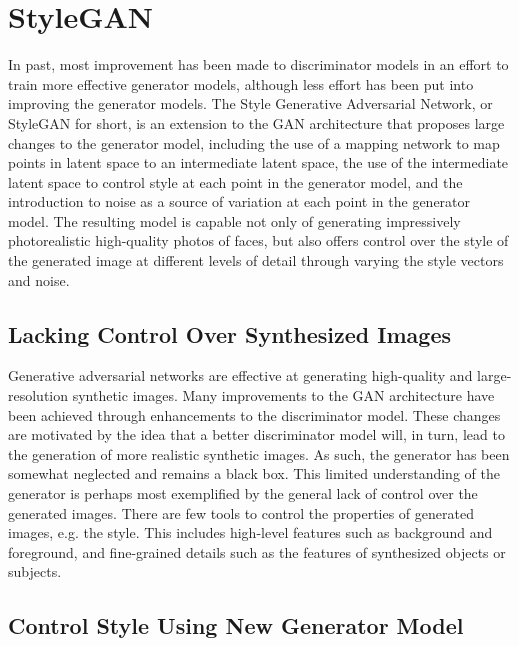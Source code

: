 \chapter{StyleGAN}
\begin{onehalfspace}
    In past, most improvement has been made to discriminator models in an effort to train more effective generator models, although less effort has been put into improving the generator models. The Style Generative Adversarial Network, or StyleGAN for short, is an extension to the GAN architecture that proposes large changes to the generator model, including the use of a mapping network to map points in latent space to an intermediate latent space, the use of the intermediate latent space to control style at each point in the generator model, and the introduction to noise as a source of variation at each point in the generator model. The resulting model is capable not only of generating impressively photorealistic high-quality photos of faces, but also offers control over the style of the generated image at different levels of detail through varying the style vectors and noise.
\section{Lacking Control Over Synthesized Images}
    Generative adversarial networks are effective at generating high-quality and large-resolution synthetic images. Many improvements to the GAN architecture have been achieved through enhancements to the discriminator model. These changes are motivated by the idea that a better discriminator model will, in turn, lead to the generation of more realistic synthetic images. As such, the generator has been somewhat neglected and remains a black box. This limited understanding of the generator is perhaps most exemplified by the general lack of control over the generated images. There are few tools to control the properties of generated images, e.g. the style. This includes high-level features such as background and foreground, and fine-grained details such as the features of synthesized objects or subjects.


\section{Control Style Using New Generator Model}


\end{onehalfspace}
